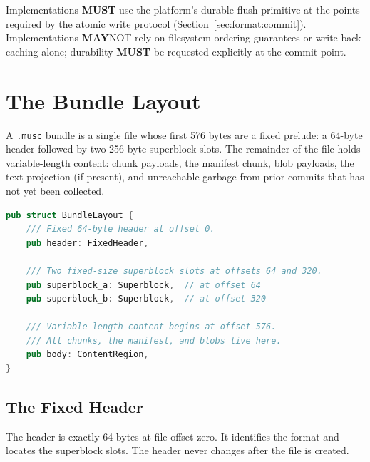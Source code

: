 \documentclass[11pt,letterpaper]{report}
\newcounter{requirement}[chapter]
\newcommand{\MUST}{\textbf{MUST}}
\newcommand{\MAY}{\textbf{MAY}}
\begin{document}
\begin{requirement}
  \label{req:format:durable-flush}
  Implementations \MUST{} use the platform's durable flush
  primitive at the points required by the atomic write protocol
  (Section~\ref{sec:format:commit}). Implementations \MAY NOT{}
  rely on filesystem ordering guarantees or write-back caching
  alone; durability \MUST{} be requested explicitly at the commit
  point.
\end{requirement}

\section{The Bundle Layout}
\label{sec:format:bundle}

A \texttt{.musc} bundle is a single file whose first 576 bytes are a
fixed prelude: a 64-byte header followed by two 256-byte superblock
slots. The remainder of the file holds variable-length content:
chunk payloads, the manifest chunk, blob payloads, the text
projection (if present), and unreachable garbage from prior commits
that has not yet been collected.

\begin{lstlisting}[language=Rust]
pub struct BundleLayout {
    /// Fixed 64-byte header at offset 0.
    pub header: FixedHeader,

    /// Two fixed-size superblock slots at offsets 64 and 320.
    pub superblock_a: Superblock,  // at offset 64
    pub superblock_b: Superblock,  // at offset 320

    /// Variable-length content begins at offset 576.
    /// All chunks, the manifest, and blobs live here.
    pub body: ContentRegion,
}
\end{lstlisting}

\subsection{The Fixed Header}

The header is exactly 64 bytes at file offset zero. It identifies
the format and locates the superblock slots. The header never
changes after the file is created.
\end{document}
